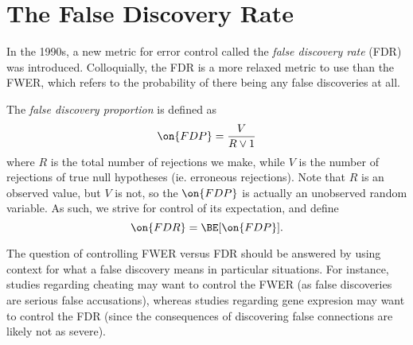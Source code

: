\section{The False Discovery Rate} 
In the 1990s, a new metric for error control called the \emph{false discovery rate} (FDR) was introduced. Colloquially, the FDR is a more relaxed metric to use than the FWER, which refers to the probability of there being any false discoveries at all.
\begin{defn}
The \emph{false discovery proportion} is defined as
\begin{equation}
\on{FDP} = \frac{V}{R \vee 1}
\end{equation}
where $R$ is the total number of rejections we make, while $V$ is the number of rejections of true null hypotheses (ie. erroneous rejections). Note that $R$ is an observed value, but $V$ is not, so the $\on{FDP}$ is actually an unobserved random variable. As such, we strive for control of its expectation, and define
\begin{equation}
\on{FDR} = \BE[\on{FDP}].
\end{equation}

\end{defn}
The question of controlling FWER versus FDR should be answered by using context for what a false discovery means in particular situations. For instance, studies regarding cheating may want to control the FWER (as false discoveries are serious false accusations), whereas studies regarding gene expresion may want to control the FDR (since the consequences of discovering false connections are likely not as severe). 

